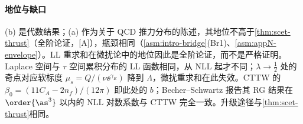 \paragraph{地位与缺口}
(b) 是代数结果；(a) 作为关于 QCD 推力分布的陈述，其地位不高于\cref{thm:scet-thrust}（全阶论证，[A]），瓶颈相同（\cref{asm:intro-bridge}(Br1)、\cref{asm:appN-envelope}）。LL 重求和在微扰论中的地位因此是全阶论证，而不是严格证明。Laplace 空间与 $\tau$ 空间累积分布的 LL 函数相同，从 NLL 起才不同；$\lambda\to\frac12$ 处的奇点对应软标度 $\mu_s=Q/(\nu\ee^{\gamma_E})$ 降到 $\Lambda$，微扰重求和在此失效。CTTW 的 $\beta_0=(11C_A-2n_f)/(12\pi)$ 即此处的 $b$；Becher--Schwartz 报告其 RG 结果在 $\order{\as^3}$ 以内的 NLL 对数系数与 CTTW 完全一致\cite[附录~C]{BecherSchwartz2008}。升级途径与\cref{thm:scet-thrust}相同。
